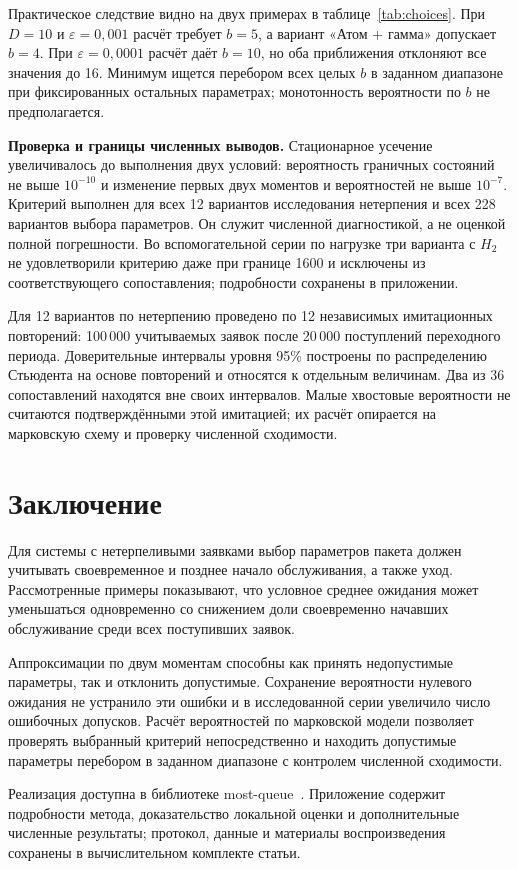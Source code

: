 Практическое следствие видно на двух примерах в таблице~\ref{tab:choices}. При $D=10$ и $\varepsilon=0{,}001$ расчёт требует $b=5$, а вариант «Атом + гамма» допускает $b=4$. При $\varepsilon=0{,}0001$ расчёт даёт $b=10$, но оба приближения отклоняют все значения до 16. Минимум ищется перебором всех целых $b$ в заданном диапазоне при фиксированных остальных параметрах; монотонность вероятности по $b$ не предполагается.

\begin{table}[htbp]\centering\small
\caption{Примеры выбора наименьшего допустимого $b\in\{2,\ldots,16\}$ по условному критерию: $E_3$, $a=1$, $\lambda=0{,}8$, $\gamma=0$, $D=10$. Прочерк --- отсутствие допустимого значения в этом диапазоне}\label{tab:choices}

\end{table}

\noindent\textbf{Проверка и границы численных выводов.}
Стационарное усечение увеличивалось до выполнения двух условий: вероятность граничных состояний не выше $10^{-10}$ и изменение первых двух моментов и вероятностей не выше $10^{-7}$. Критерий выполнен для всех 12 вариантов исследования нетерпения и всех 228 вариантов выбора параметров. Он служит численной диагностикой, а не оценкой полной погрешности. Во вспомогательной серии по нагрузке три варианта с $H_2$ не удовлетворили критерию даже при границе 1600 и исключены из соответствующего сопоставления; подробности сохранены в приложении.

Для 12 вариантов по нетерпению проведено по 12 независимых имитационных повторений: 100\,000 учитываемых заявок после 20\,000 поступлений переходного периода. Доверительные интервалы уровня 95\% построены по распределению Стьюдента на основе повторений и относятся к отдельным величинам. Два из 36 сопоставлений находятся вне своих интервалов. Малые хвостовые вероятности не считаются подтверждёнными этой имитацией; их расчёт опирается на марковскую схему и проверку численной сходимости.

\section*{Заключение}

Для системы с нетерпеливыми заявками выбор параметров пакета должен учитывать своевременное и позднее начало обслуживания, а также уход. Рассмотренные примеры показывают, что условное среднее ожидания может уменьшаться одновременно со снижением доли своевременно начавших обслуживание среди всех поступивших заявок.

Аппроксимации по двум моментам способны как принять недопустимые параметры, так и отклонить допустимые. Сохранение вероятности нулевого ожидания не устранило эти ошибки и в исследованной серии увеличило число ошибочных допусков. Расчёт вероятностей по марковской модели позволяет проверять выбранный критерий непосредственно и находить допустимые параметры перебором в заданном диапазоне с контролем численной сходимости.

Реализация доступна в библиотеке most-queue~\cite{mostqueue2026}. Приложение содержит подробности метода, доказательство локальной оценки и дополнительные численные результаты; протокол, данные и материалы воспроизведения сохранены в вычислительном комплекте статьи.
